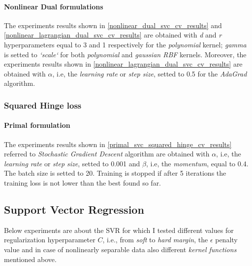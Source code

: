 \paragraph{Nonlinear Dual formulations}

The experiments results shown in \ref{nonlinear_dual_svc_cv_results} and \ref{nonlinear_lagrangian_dual_svc_cv_results} are obtained with \emph{d} and \emph{r} hyperparameters equal to 3 and 1 respectively for the \emph{polynomial} kernel; \emph{gamma} is setted to \emph{`scale`} for both \emph{polynomial} and \emph{gaussian RBF} kernels. Moreover, the experiments results shown in \ref{nonlinear_lagrangian_dual_svc_cv_results} are obtained with $\alpha$, i.e, the \emph{learning rate} or \emph{step size}, setted to 0.5 for the \emph{AdaGrad} algorithm.






\subsubsection{Squared Hinge loss}

\paragraph{Primal formulation}

The experiments results shown in \ref{primal_svc_squared_hinge_cv_results} referred to \emph{Stochastic Gradient Descent} algorithm are obtained with $\alpha$, i.e, the \emph{learning rate} or \emph{step size}, setted to 0.001 and $\beta$, i.e, the \emph{momentum}, equal to 0.4. The batch size is setted to 20. Training is stopped if after 5 iterations the training loss is not lower than the best found so far.





\subsection{Support Vector Regression}

Below experiments are about the SVR for which I tested different values for regularization hyperparameter $C$, i.e., from \emph{soft} to \emph{hard margin}, the $\epsilon$ penalty value and in case of nonlinearly separable data also different \emph{kernel functions} mentioned above.

